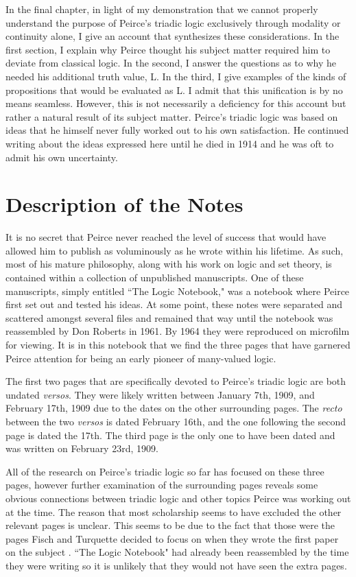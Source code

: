 \documentclass[12pt]{article}
\begin{document}
In the final chapter, in light of my demonstration that we cannot properly understand the purpose of Peirce's triadic logic exclusively through modality or continuity alone, I give an account that synthesizes these considerations. In the first section, I explain why Peirce thought his subject matter required him to deviate from classical logic. In the second, I answer the questions as to why he needed his additional truth value, L. In the third, I give examples of the kinds of propositions that would be evaluated as L. I admit that this unification is by no means seamless. However, this is not necessarily a deficiency for this account but rather a natural result of its subject matter. Peirce's triadic logic was based on ideas that he himself never fully worked out to his own satisfaction. He continued writing about the ideas expressed here until he died in 1914 and he was oft to admit his own uncertainty.

\section{Description of the Notes}

It is no secret that Peirce never reached the level of success that would have allowed him to publish as voluminously as he wrote within his lifetime. As such, most of his mature philosophy, along with his work on logic and set theory, is contained within a collection of unpublished manuscripts. One of these manuscripts, simply entitled ``The Logic Notebook," was a notebook where Peirce first set out and tested his ideas. At some point, these notes were separated and scattered amongst several files and remained  that way until the notebook was reassembled by Don Roberts in 1961. By 1964 they were reproduced on microfilm for viewing. It is in this notebook that we find the three pages that have garnered Peirce attention for being an early pioneer of many-valued logic.

The first two pages that are specifically devoted to Peirce's triadic logic are both undated \textit{versos}. They were likely written between January 7th, 1909, and February 17th, 1909 due to the dates on the other surrounding pages. The \textit{recto} between the two \textit{versos} is dated February 16th, and the one following the second page is dated the 17th. The third page is the only one to have been dated and was written on February 23rd, 1909.

All of the research on Peirce's triadic logic so far has focused on these three pages, however further examination of the surrounding pages reveals some obvious connections between triadic logic and other topics Peirce was working out at the time. The reason that most scholarship seems to have excluded the other relevant pages is unclear. This seems to be due to the fact that those were the pages Fisch and Turquette decided to focus on when they wrote the first paper on the subject \citep{fisch1966peirce}. ``The Logic Notebook" had already been reassembled by the time they were writing so it is unlikely that they would not have seen the extra pages.
\end{document}
